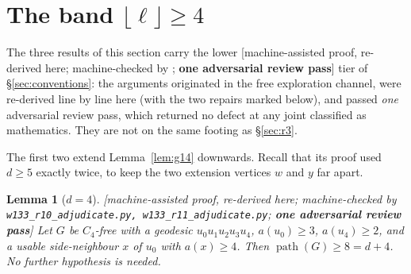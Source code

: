 \documentclass[11pt]{article}
\theoremstyle{plain}
\newtheorem{lemma}[theorem]{Lemma}
\theoremstyle{definition}
\theoremstyle{remark}
\numberwithin{equation}{section}
\newcommand{\pth}{\operatorname{path}}
\newcommand{\statusbox}[1]{{\small\sloppy\textsf{[#1]}}}
\newcommand{\AD}[1]{\statusbox{machine-assisted proof, re-derived here;
machine-checked by \texttt{#1}; \textbf{one adversarial review pass}}}
\begin{document}
\section{The band $\lfloor \ell\rfloor \ge 4$}\label{sec:adopted}

The three results of this section carry the lower \AD{} tier of \S\ref{sec:conventions}: the
arguments originated in the free exploration channel, were re-derived line by line here
(with the two repairs marked below), and passed \emph{one} adversarial review pass, which
returned no defect at any joint classified as mathematics. They are not on the same footing
as \S\ref{sec:r3}.

The first two extend Lemma~\ref{lem:g14} downwards. Recall that its proof used $d \ge 5$
exactly twice, to keep the two extension vertices $w$ and $y$ far apart.

\begin{lemma}[$d = 4$]\label{lem:g36}
\AD{w133\_r10\_adjudicate.py, w133\_r11\_adjudicate.py}
Let $G$ be $C_4$-free with a geodesic $u_0u_1u_2u_3u_4$, $a(u_0)\ge 3$, $a(u_4)\ge 2$, and a
usable side-neighbour $x$ of $u_0$ with $a(x)\ge 4$. Then $\pth(G)\ge 8 = d+4$. No further
hypothesis is needed.
\end{lemma}
\end{document}
